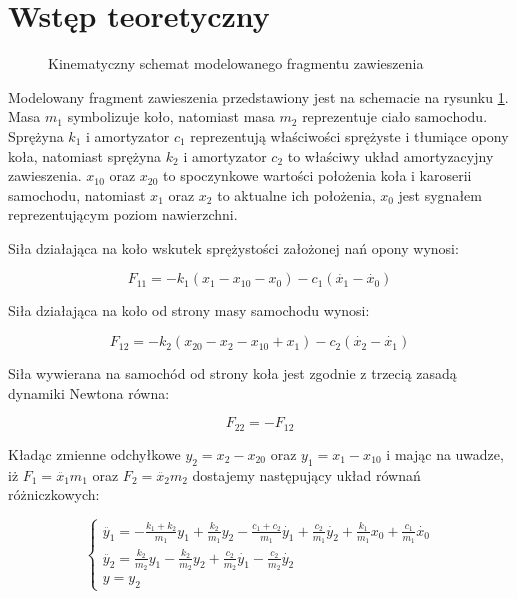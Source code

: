 \documentclass[12pt]{article}
\begin{document}


\section{Wstęp teoretyczny}


\begin{figure}[!htb]
	\begin{center}
		
		\caption{Kinematyczny schemat modelowanego fragmentu
		zawieszenia}\label{rys:sch}
	\end{center}
\end{figure}

Modelowany fragment zawieszenia przedstawiony jest na schemacie na rysunku
\ref{rys:sch}. Masa $m_1$ symbolizuje koło, natomiast masa $m_2$
reprezentuje ciało samochodu. Sprężyna $k_1$ i amortyzator $c_1$ reprezentują
właściwości sprężyste i tłumiące opony koła, natomiast sprężyna $k_2$ i
amortyzator $c_2$ to właściwy układ amortyzacyjny zawieszenia. $x_{10}$ oraz
$x_{20}$ to spoczynkowe wartości położenia koła i karoserii samochodu, natomiast
$x_1$ oraz $x_2$ to aktualne ich położenia, $x_0$ jest sygnałem
reprezentującym poziom nawierzchni.
 
\newpage

Siła działająca na koło wskutek sprężystości założonej nań opony wynosi:

\begin{equation*}
	F_{11} = -k_1(x_1-x_{10}-x_0)-c_1(\dot{x_1}-\dot{x_0})
\end{equation*}

Siła działająca na koło od strony masy samochodu wynosi:

\begin{equation*}
	F_{12} = -k_2(x_{20}-x_2-x_{10}+x_1)-c_2(\dot{x_2}-\dot{x_1})
\end{equation*}

Siła wywierana na samochód od strony koła jest zgodnie z trzecią zasadą dynamiki
Newtona równa:

\begin{equation*}
	F_{22} = -F_{12}
\end{equation*}

Kładąc zmienne odchyłkowe $y_2=x_2-x_{20}$ oraz $y_1=x_1-x_{10}$ i
mając na uwadze, iż $F_1=\ddot{x_1}m_1$ oraz $F_2=\ddot{x_2}m_2$ dostajemy następujący
układ równań różniczkowych:

\begin{equation}
	\begin{cases}
		\ddot{y_1}=
								-\frac{k_1+k_2}{m_1}y_1+\frac{k_2}{m_1}y_2-\frac{c_1+c_2}{m_1}\dot{y_1}
								+\frac{c_2}{m_1}\dot{y_2}+\frac{k_1}{m_1}x_0+\frac{c_1}{m_1}\dot{x_0}
								\\
		\ddot{y_2}=
								\frac{k_2}{m_2}y_1-\frac{k_2}{m_2}y_2+\frac{c_2}{m_2}\dot{y_1}
								-\frac{c_2}{m_2}\dot{y_2}						
								\\
		y=y_2
	\end{cases}
	\label{equ:uklrow}
\end{equation}
\end{document}
